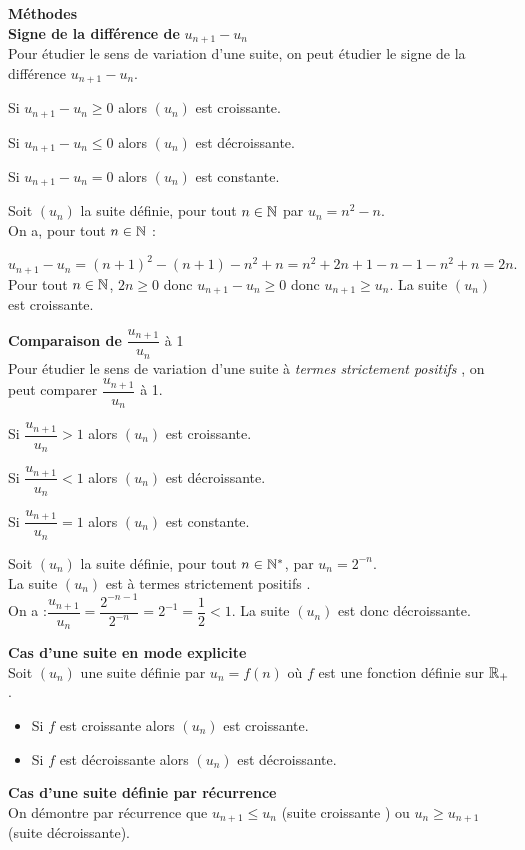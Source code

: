 \textbf{Méthodes}\\
\textbf{Signe de la différence de }  $ u_{n+1}- u_{n} $ \\
 Pour étudier le sens de variation d'une suite, on peut étudier le signe de la différence   $  u_{n+1}- u_{n} $.

Si $ u_{n+1}- u_{n}\geq 0 $ alors $(u_{n})$ est croissante.

Si $ u_{n+1}- u_{n}\leq 0 $ alors $(u_{n})$ est décroissante.

Si $ u_{n+1}- u_{n}=0 $ alors $(u_{n})$ est constante.
\begin{example} 
 Soit $(u_{n})$ la suite définie, pour tout $ n\in\mathbb{N} $ par $ u_{n} = n^{2} -n $.  \\              On a, pour tout $ n\in\mathbb{N} $ :

 $ u_{n+1}- u_{n} = (n +1)^{2} -(n +1)-n^{2} +n = n^{2} +2n +1-n -1-n^{2} +n = 2n. $
Pour tout $ n\in\mathbb{N} $, $2n \geq 0  $ donc $ u_{n+1}- u_{n}\geq 0 $ donc $ u_{n+1}\geq u_{n} $. 
La suite  $(u_{n})$  est croissante.
\end{example}
\textbf{Comparaison de } $ \dfrac{u_{n+1}}{u_{n}} $ à 1 \\
 Pour étudier le sens de variation d'une suite à \emph{termes strictement positifs } , on peut comparer $ \dfrac{u_{n+1}}{u_{n}} $   à 1.

Si $ \dfrac{u_{n+1}}{u_{n}}>1 $ alors $(u_{n})$ est croissante.

Si $ \dfrac{u_{n+1}}{u_{n}}<1 $ alors $(u_{n})$ est décroissante.

Si $ \dfrac{u_{n+1}}{u_{n}}=1 $ alors $(u_{n})$ est constante.

\begin{example}
Soit $(u_{n})$ la suite définie, pour tout $n\in \mathbb{N}^* $, par $ u_{n}=2^{-n} $.\\ La suite $(u_{n})$ est à termes strictement positifs .\\
On a :$ \dfrac{u_{n+1}}{u_{n}}=\dfrac{2^{-n-1}}{2^{-n}}=2^{-1}=\dfrac{1}{2}<1 $.
 La suite  $(u_{n})$  est donc décroissante.
\end{example}

\textbf{Cas d'une suite en mode explicite }\\
Soit $(u_{n})$ une suite définie par $ u_{n} = f (n) $ où $f$ est une fonction définie sur $ \mathbb{R}_+ $.
\begin{itemize}
\item[\textbullet] Si $ f $ est croissante alors $(u_{n})$ est croissante.
 \item[\textbullet] Si $ f $ est décroissante alors $(u_{n})$ est décroissante.
\end{itemize}
\textbf{Cas d'une suite définie  par récurrence}\\
On  démontre par récurrence que  $u_{n+1}\leq u_{n}$ (suite croissante ) ou $ u_{n}\geq u_{n+1} $ (suite décroissante).
